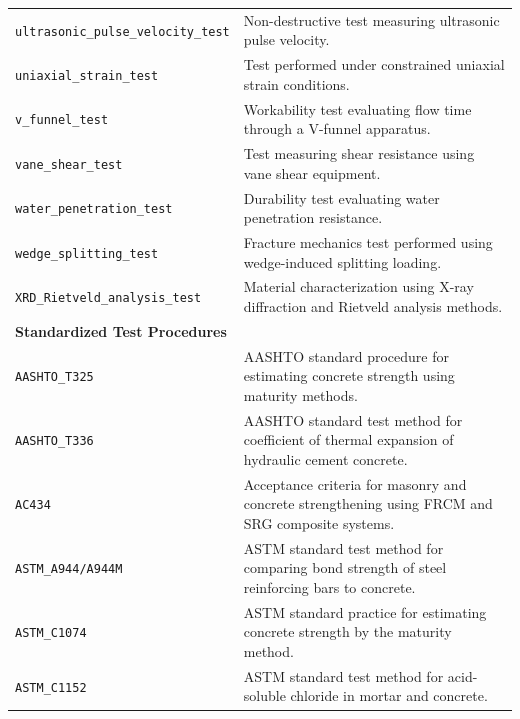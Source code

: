 \documentclass[11pt]{book}
\begin{document}
{\begin{longtable}{p{}p{}}
\texttt{ultrasonic\_pulse\_velocity\_test} &
Non-destructive test measuring ultrasonic pulse velocity. \\

\texttt{uniaxial\_strain\_test} &
Test performed under constrained uniaxial strain conditions. \\

\texttt{v\_funnel\_test} &
Workability test evaluating flow time through a V-funnel apparatus. \\

\texttt{vane\_shear\_test} &
Test measuring shear resistance using vane shear equipment. \\

\texttt{water\_penetration\_test} &
Durability test evaluating water penetration resistance. \\

\texttt{wedge\_splitting\_test} &
Fracture mechanics test performed using wedge-induced splitting loading. \\

\texttt{XRD\_Rietveld\_analysis\_test} &
Material characterization using X-ray diffraction and Rietveld analysis methods. \\

\hline
\multicolumn{2}{l}{\textbf{Standardized Test Procedures}}\\
\hline

\texttt{AASHTO\_T325} &
AASHTO standard procedure for estimating concrete strength using maturity methods. \\

\texttt{AASHTO\_T336} &
AASHTO standard test method for coefficient of thermal expansion of hydraulic cement concrete. \\

\texttt{AC434} &
Acceptance criteria for masonry and concrete strengthening using FRCM and SRG composite systems. \\

\texttt{ASTM\_A944/A944M} &
ASTM standard test method for comparing bond strength of steel reinforcing bars to concrete. \\

\texttt{ASTM\_C1074} &
ASTM standard practice for estimating concrete strength by the maturity method. \\

\texttt{ASTM\_C1152} &
ASTM standard test method for acid-soluble chloride in mortar and concrete. \\


\end{longtable}}
\end{document}
